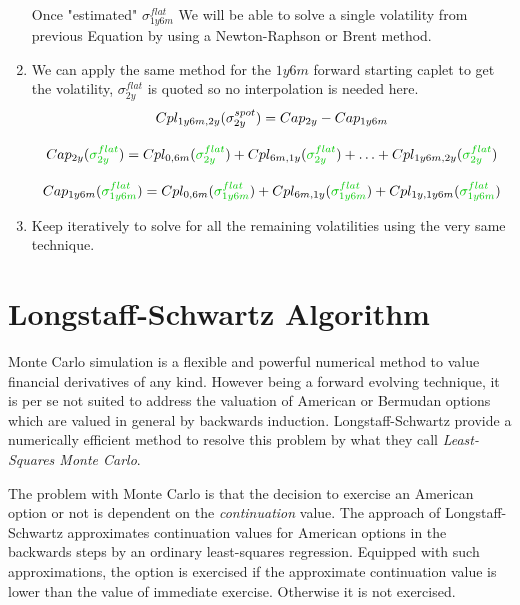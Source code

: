 \documentclass[12pt,a4paper]{article}
\begin{document}
\begin{enumerate}
Once "estimated" $\sigma^{flat}_{1y6m}$ We will be able to solve a single volatility from previous Equation by using a Newton-Raphson or Brent method.

\item We can apply the same method for the $1y6m$ forward starting caplet to get the volatility, $\sigma^{flat}_{2y}$ is quoted so no interpolation is needed here.
\begin{equation}
\begin{gathered}
Cpl_{1y6m, 2y}(\sigma^{spot}_{2y})=Cap_{2y}-Cap_{1y6m} \\[0.3cm]
Cap_{2y}(\textcolor{ipython-green}{\sigma^{flat}_{2y}})=Cpl_{0,6m}(\textcolor{ipython-green}{\sigma^{flat}_{2y}}) + Cpl_{6m,1y}(\textcolor{ipython-green}{\sigma^{flat}_{2y}}) + \ldots + Cpl_{1y6m,2y}(\textcolor{ipython-green}{\sigma^{flat}_{2y}}) \\[0.3cm]
Cap_{1y6m}(\textcolor{ipython-green}{\sigma^{flat}_{1y6m}})=Cpl_{0,6m}(\textcolor{ipython-green}{\sigma^{flat}_{1y6m}}) + Cpl_{6m,1y}(\textcolor{ipython-green}{\sigma^{flat}_{1y6m}}) + Cpl_{1y,1y6m}(\textcolor{ipython-green}{\sigma^{flat}_{1y6m}})
\end{gathered}
\end{equation}

\item Keep iteratively to solve for all the remaining volatilities using the very same technique.
\end{enumerate}

\clearpage
\section{Longstaff-Schwartz Algorithm}

Monte Carlo simulation is a flexible and powerful numerical method to value financial derivatives of any kind. However being a forward evolving technique, it is per se not suited to address the valuation of American or Bermudan options which are valued in general by backwards induction. Longstaff-Schwartz provide a numerically efficient method to resolve this problem by what they call \emph{Least-Squares Monte Carlo}.

The problem with Monte Carlo is that the decision to exercise an American option or not is dependent on the \emph{continuation} value. %
The approach of Longstaff-Schwartz approximates continuation values for American options in the backwards steps by an ordinary least-squares regression.
Equipped with such approximations, the option is exercised if the approximate continuation value is lower than the value of immediate exercise. Otherwise it is not exercised.
\end{document}
